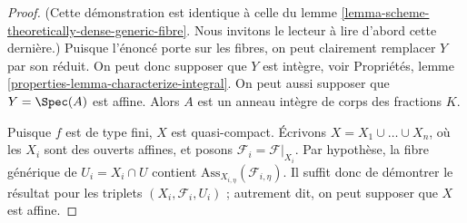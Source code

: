 \begin{proof}
(Cette démonstration est identique à celle du
lemme \ref{lemma-scheme-theoretically-dense-generic-fibre}.
Nous invitons le lecteur à lire d'abord cette dernière.)
Puisque l'énoncé porte sur les fibres, on peut clairement remplacer
$Y$ par son réduit. On peut donc supposer que $Y$ est intègre, voir
Propriétés, lemme \ref{properties-lemma-characterize-integral}.
On peut aussi supposer que $Y = \Spec(A)$ est affine. Alors $A$
est un anneau intègre de corps des fractions $K$.

\medskip\noindent
Puisque $f$ est de type fini, $X$ est quasi-compact.
Écrivons $X = X_1 \cup \ldots \cup X_n$, où les $X_i$ sont des ouverts affines,
et posons $\mathcal{F}_i = \mathcal{F}|_{X_i}$. Par
hypothèse, la fibre générique de $U_i = X_i \cap U$ contient
$\text{Ass}_{X_{i, \eta}}(\mathcal{F}_{i, \eta})$.
Il suffit donc de démontrer le résultat pour les triplets
$(X_i, \mathcal{F}_i, U_i)$ ;
autrement dit, on peut supposer que $X$ est affine.


\end{proof}

